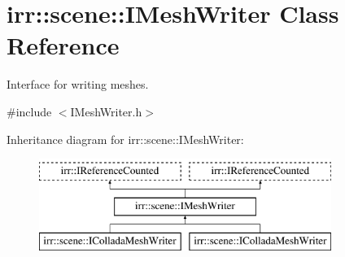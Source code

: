 \hypertarget{classirr_1_1scene_1_1IMeshWriter}{}\section{irr\+:\+:scene\+:\+:I\+Mesh\+Writer Class Reference}
\label{classirr_1_1scene_1_1IMeshWriter}


Interface for writing meshes.  




{\ttfamily \#include $<$I\+Mesh\+Writer.\+h$>$}

Inheritance diagram for irr\+:\+:scene\+:\+:I\+Mesh\+Writer\+:\begin{figure}[H]
\begin{center}
\leavevmode
\includegraphics[height=3.000000cm]{classirr_1_1scene_1_1IMeshWriter}
\end{center}
\end{figure}
